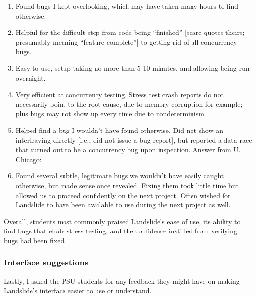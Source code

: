 \begin{enumerate}
	\item Found bugs I kept overlooking, which may have taken many hours to find otherwise.
	\item Helpful for the difficult step from code being ``finished''
		[scare-quotes theirs; presumably meaning ``feature-complete'']
		to getting rid of all concurrency bugs.
	\item Easy to use, setup taking no more than 5-10 minutes, and allowing being run overnight.
	\item Very efficient at concurrency testing.
		Stress test crash reports do not necessarily point to the root cause, due to memory corruption for example;
		plus bugs may not show up every time due to nondeterminism.
	\item Helped find a bug I wouldn't have found otherwise.
		Did not show an interleaving directly [i.e., did not issue a bug report],
		but reported a data race that turned out to be a concurrency bug upon inspection.
Answer from U. Chicago:
	\item Found several subtle, legitimate bugs we wouldn't have easily caught otherwise, but made sense once revealed.
		Fixing them took little time but allowed us to proceed confidently on the next project.
		Often wished for Landslide to have been available to use during the next project as well.
\end{enumerate}

\noindent
Overall, students most commonly praised Landslide's ease of use,
its ability to find bugs that elude stress testing,
and the confidence instilled from verifying bugs had been fixed.

\subsubsection{Interface suggestions}

Lastly, I asked the PSU students for any feedback they might have on making Landslide's interface easier to use or understand.

